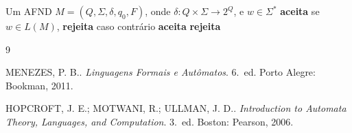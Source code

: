 \documentclass[12pt, a4paper]{article}
\theoremstyle{definition}
\theoremstyle{plain}
\theoremstyle{remark}
\begin{document}
\begin{algorithm}[H]
  \caption{Simulação de um AFND com Backtracking}
  \label{alg:afndBacktracking}
  \begin{algorithmic}[1]
    \Require Um AFND $M = (Q, \Sigma, \delta, q_0, F)$,
            onde $\delta : Q \times \Sigma \to 2^Q$,
             e $w \in \Sigma^*$
    \Ensure  \textbf{aceita} se $w \in L(M)$, \textbf{rejeita} caso contrário
      \State \Return \textbf{aceita}
    \Else
      \State \Return \textbf{rejeita}
    \EndIf
  \end{algorithmic}
\end{algorithm}

\newpage
\begin{thebibliography}{9}

MENEZES, P. B.\@.
\textit{Linguagens Formais e Autômatos}.
6.~ed. Porto Alegre: Bookman, 2011.

HOPCROFT, J. E.; MOTWANI, R.; ULLMAN, J. D.\@.
\textit{Introduction to Automata Theory, Languages, and Computation}.
3.~ed. Boston: Pearson, 2006.

\end{thebibliography}
\end{document}
